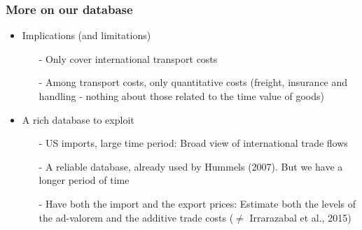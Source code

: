 \documentclass[10 pt,Helvetica, french]{beamer}
\begin{document}
\appendix
\begin{frame}[label=app_data]
\frametitle{More on our database}
\begin{itemize}
\item Implications (and limitations) \vspace{0.1cm}
\begin{itemize}
\item[-] Only cover international transport costs \vspace{0.1cm}
\item[-] Among transport costs, only quantitative costs (freight, insurance and handling - nothing about those related to the time value of goods) \vspace{0.1cm}
\end{itemize}
\item A rich database to exploit \vspace{0.1cm}
\begin{itemize}
\item[-] US imports, large time period: Broad view of international trade flows \vspace{0.1cm}
\item[-] A reliable database, already used by Hummels (2007). But we have a longer period of time \vspace{0.1cm}
\item[-] Have both the import and the export prices: Estimate both the levels of the ad-valorem and the additive trade costs ($\neq$ Irrarazabal et al., 2015)
\end{itemize}
\end{itemize}
\hyperlink{slide_data}{}
\end{frame}
\end{document}
